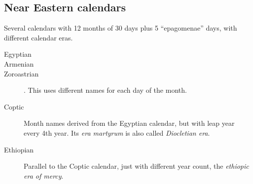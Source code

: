 \subsection{Near Eastern calendars}
Several calendars with 12 months of 30 days plus 5 ``epagomenae''
days, with different calendar eras.
\begin{description}
\item[Egyptian]
\item[Armenian]
\item[Zoroastrian]. This uses different names for each day of the month.
\item[Coptic] Month names derived from the Egyptian calendar, but with leap year every 4th year. Its \emph{era martyrum} is also called \emph{Diocletian era}.
\item[Ethiopian] Parallel to the Coptic calendar, just with different year count, the \emph{ethiopic era of mercy}.
\end{description}

